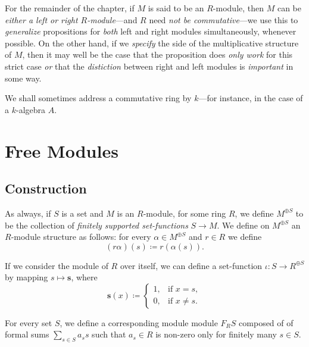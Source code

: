 \begin{remark}
\label{rem:R-modules-convension}
For the remainder of the chapter, if \(M\) is said to be an \(R\)-module, then
\(M\) can be \emph{either a left or right \(R\)-module}---and \(R\) need
\emph{not be commutative}---we use this to \emph{generalize} propositions for
\emph{both} left and right modules simultaneously, whenever possible. On the
other hand, if we \emph{specify} the side of the multiplicative structure of
\(M\), then it may well be the case that the proposition does \emph{only work}
for this strict case \emph{or} that the \emph{distiction} between right and left
modules is \emph{important} in some way.
\end{remark}

\begin{remark}
\label{rem:algebras-and-commutative-rings}
We shall sometimes address a commutative ring by \(k\)---for instance, in the case
of a \(k\)-algebra \(A\).
\end{remark}

\section{Free Modules}

\subsection{Construction}

As always, if \(S\) is a set and \(M\) is an \(R\)-module, for some ring \(R\),
we define \(M^{\oplus S}\) to be the collection of \emph{finitely supported
  set-functions} \(S \to M\). We define on \(M^{\oplus S}\) an \(R\)-module
structure as follows: for every \(\alpha \in M^{\oplus S}\) and \(r \in R\) we
define
\[
(r \alpha)(s) \coloneq r (\alpha(s)).
\]

If we consider the module of \(R\) over itself, we can define a set-function
\(\iota: S \to R^{\oplus S}\) by mapping \(s \mapsto \mathbf{s}\), where
\[
\mathbf{s}(x) \coloneq
\begin{cases}
  1, &\text{if } x = s, \\
  0, &\text{if } x \neq s.
\end{cases}
\]

For every set \(S\), we define a corresponding module module \(F_R S\) composed
of of formal sums \(\sum_{s \in S} a_s s\) such that \(a_s \in R\) is non-zero
only for finitely many \(s \in S\).

